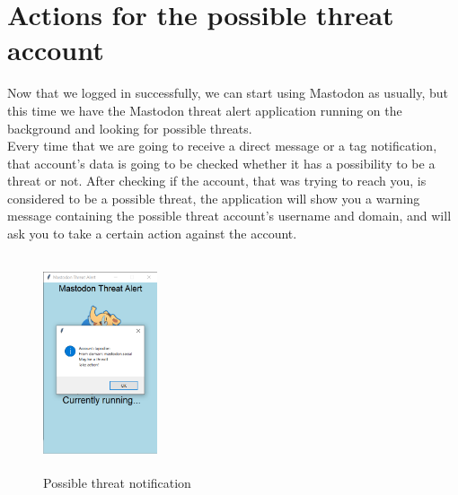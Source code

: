 \section{Actions for the possible threat account}
\label{s:Actions_threat}
Now that we logged in successfully, we can start using Mastodon as usually, but this
time we have the Mastodon threat alert application running on the background and looking
for possible threats.
\\[5pt]
Every time that we are going to receive a direct message or a tag notification, that account's data is going to be checked whether it has a possibility to be a threat or not. After checking
if the account, that was trying to reach you, is considered to be a possible threat, the application
will show you a warning message containing the possible threat account's username and domain,
and will ask you to take a certain action against the account.
\begin{figure}[H]
	\centering
	\includegraphics[width=0.3\textwidth,height=240px]{images/threatnotif.png}
	\caption{Possible threat notification}
	\label{fig:possible_threat_notification}
\end{figure}

